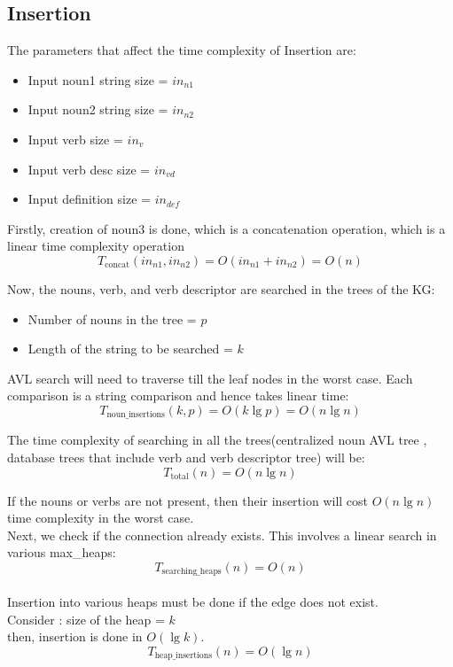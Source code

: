 \documentclass[conference]{IEEEtran}
\begin{document}
\subsection{Insertion}
The parameters that affect the time complexity of Insertion are:
\begin{itemize}
    \item Input noun1 string size = $in_{n1}$
    \item Input noun2 string size = $in_{n2}$
    \item Input verb size = $in_{v}$
    \item Input verb desc size = $in_{vd}$
    \item Input definition size = $in_{def}$
\end{itemize}

Firstly, creation of noun3 is done, which is a concatenation operation, which is a linear time complexity operation
\\
\begin{equation}
	T_{\text{concat}}(in_{n1}, in_{n2}) = O(in_{n1} + in_{n2}) = O(n)
\end{equation}

Now, the nouns, verb, and verb descriptor are searched in the trees of the KG:
\begin{itemize}
    \item Number of nouns in the tree = $p$
    \item Length of the string to be searched = $k$
\end{itemize}
AVL search will need to traverse till the leaf nodes in the worst case. Each comparison is a string comparison and hence takes linear time:
\begin{equation}
	T_{\text{noun\_insertions}}(k, p) = O(k \lg p) = O(n \lg n)
\end{equation}


The time complexity of searching in all the trees(centralized noun AVL tree , database trees that include verb and verb descriptor tree) will be:
\begin{equation}
	T_{\text{total}}(n) = O(n \lg n)
\end{equation}

If the nouns or verbs are not present, then their insertion  will cost $O(n \lg n)$ time complexity in the worst case.
\\
Next, we check if the connection already exists. This involves a linear search in various max\_heaps:
\begin{equation}
	T_{\text{searching\_heaps}}(n) = O(n)
\end{equation}
\\
Insertion into various heaps must be done if the edge does not exist. \\Consider : size of the heap = $k$
\\then, insertion is done in $O(\lg k)$.
\\
\begin{equation}
	T_{\text{heap\_insertions}}(n) = O(\lg n)
\end{equation}
\end{document}
